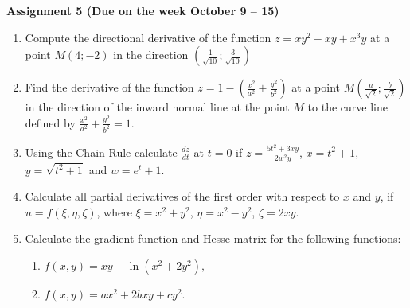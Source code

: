 \documentclass{article}
\begin{document}
\fontsize{14}{21}
\selectfont
\centerline{\textbf{Assignment 5 (Due on the week October 9 -- 15)}}
\fontsize{12}{18}
\selectfont

\begin{enumerate}

\item Compute the directional derivative of the function $z=xy^2-xy+x^3y$ at a point
$M (4; -2)$ in the direction $\left(\frac 1{\sqrt{10}};\frac 3{\sqrt{10}}\right)$ 

\item Find the derivative of the function $z=1-\left(\frac{x^2}{a^2}+\frac{y^2}{b^2}\right)$ at a point $M\left(\frac a{\sqrt{2}};\frac b{\sqrt{2}}\right)$  in the direction of the inward normal line at the point $M$ to the curve line defined by $\frac{x^2}{a^2}+\frac{y^2}{b^2}=1$.

\item Using the Chain Rule calculate $\frac{dz}{dt}$ at $t=0$ if $z=\frac{5t^2+3xy}{2w^2y}$, $x=t^2+1$, $y=\sqrt{t^2+1}$ and $w=e^t+1$.

\item Calculate all partial derivatives of the first order with respect to $x$ and $y$, if $u=f(\xi,\eta,\zeta)$, where $\xi=x^2+y^2$, $\eta=x^2-y^2$, $\zeta=2xy$.

\item Calculate the gradient function and Hesse matrix for the following functions:
 \begin{enumerate}
 \item $f(x,y)=xy-\ln (x^2+2y^2),$
 \item $f(x,y)=ax^2+2bxy+cy^2.$
 \end{enumerate}

\end{enumerate} 
\end{document}
